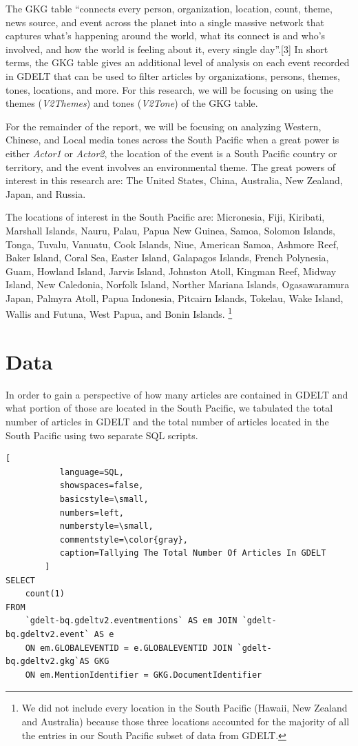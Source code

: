 \documentclass[12pt]{article}
\begin{document}
The GKG table “connects every person, organization, location, count, theme, news source, and event across the planet into a single massive network that captures what’s happening around the world, what its connect is and who's involved, and how the world is feeling about it, every single day”.[3] In short terms, the GKG table gives an additional level of analysis on each event recorded in GDELT that can be used to filter articles by organizations, persons, themes, tones, locations, and more. For this research, we will be focusing on using the themes (\textit{V2Themes}) and tones (\textit{V2Tone}) of the GKG table. 

For the remainder of the report, we will be focusing on analyzing Western, Chinese, and Local media tones across the South Pacific when a great power is either \textit{Actor1} or \textit{Actor2}, the location of the event is a South Pacific country or territory, and the event involves an environmental theme. The great powers of interest in this research are: The United States, China, Australia, New Zealand, Japan, and Russia. 

The locations of interest in the South Pacific are: Micronesia, Fiji, Kiribati, Marshall Islands, Nauru, Palau, Papua New Guinea, Samoa, Solomon Islands, Tonga, Tuvalu, Vanuatu, Cook Islands, Niue, American Samoa, Ashmore Reef, Baker Island, Coral Sea, Easter Island, Galapagos Islands, French Polynesia, Guam, Howland Island, Jarvis Island, Johnston Atoll, Kingman Reef, Midway Island, New Caledonia, Norfolk Island, Norther Mariana Islands, Ogasawaramura Japan, Palmyra Atoll, Papua Indonesia, Pitcairn Islands, Tokelau, Wake Island, Wallis and Futuna, West Papua, and Bonin Islands. \renewcommand{\thefootnote}{\roman{footnote}}\footnote{We did not include every location in the South Pacific (Hawaii, New Zealand and Australia) because those three locations accounted for the majority of all the entries in our South Pacific subset of data from GDELT.}

\section*{Data} %

In order to gain a perspective of how many articles are contained in GDELT and what portion of those are located in the South Pacific, we tabulated the total number of articles in GDELT and the total number of articles located in the South Pacific using two separate SQL scripts.

\begin{lstlisting}[
           language=SQL,
           showspaces=false,
           basicstyle=\small,
           numbers=left,
           numberstyle=\small,
           commentstyle=\color{gray},
           caption=Tallying The Total Number Of Articles In GDELT
        ]
SELECT 
    count(1) 
FROM 
    `gdelt-bq.gdeltv2.eventmentions` AS em JOIN `gdelt-bq.gdeltv2.event` AS e 
    ON em.GLOBALEVENTID = e.GLOBALEVENTID JOIN `gdelt-bq.gdeltv2.gkg`AS GKG 
    ON em.MentionIdentifier = GKG.DocumentIdentifier
\end{lstlisting}
\end{document}
